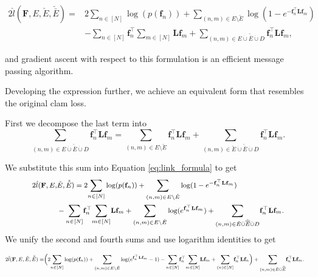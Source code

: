 \documentclass{article}
\theoremstyle{plain}
\theoremstyle{definition}
\theoremstyle{remark}
\begin{document}
\footnotesize
\begin{equation}
\begin{split}
2\hat{l}(\mathbf{F}, E, \check{E},  \check{\bar{E}})=&2\underset{n\in [N]}{\sum} \log(p(\mathbf{f}_n)) 
+ \underset{(n,m)\in E\setminus\check{E}}{\sum} \log(1-e^{-\mathbf{f}_n^\top \mathbf{L} \mathbf{f}_m}) \\
&- \underset{n\in [N]}{\sum} \mathbf{f}_n^\top \underset{m\in [N]}{\sum} \mathbf{L} \mathbf{f}_m
+\underset{(n,m)\in E \dot{\cup} \check{\overline{E}}\dot{\cup}D}{\sum} \mathbf{f}_n^\top \mathbf{L} \mathbf{f}_m,
\end{split}
\label{eq:link_formula}
\end{equation}

and gradient ascent with respect to this formulation is an efficient message passing algorithm.

Developing the expression further, we achieve an equivalent form that resembles the original clam loss.

First we decompose the last term into
\[\underset{(n,m)\in E \dot{\cup} \check{\overline{E}}\dot{\cup}D}{\sum} \mathbf{f}_n^\top \mathbf{L} \mathbf{f}_m = 
\underset{(n,m)\in E \setminus \check{E}}{\sum} \mathbf{f}_n^\top \mathbf{L} \mathbf{f}_m +
\underset{(n,m)\in \check{E} \dot{\cup} \check{\overline{E}}\dot{\cup}D}{\sum} \mathbf{f}_n^\top \mathbf{L} \mathbf{f}_m.\]

We substitute this sum into Equation \ref{eq:link_formula} to get
\[
\footnotesize
\begin{split}
2\hat{l}(\mathbf{F}, E, &\check{E},  \check{\bar{E}})=
2\underset{n\in [N]}{\sum} \log(p(\mathbf{f}_n)) 
+ \underset{(n,m)\in E\setminus\check{E}}{\sum} \log(1-e^{-\mathbf{f}_n^\top \mathbf{L} \mathbf{f}_m}) \\
&- \underset{n\in [N]}{\sum} \mathbf{f}_n^\top \underset{m\in [N]}{\sum} \mathbf{L} \mathbf{f}_m
+\underset{(n,m)\in E\setminus\check{E}}{\sum} \log(e^{\mathbf{f}_n^\top \mathbf{L} \mathbf{f}_m})
+\underset{(n,m)\in \check{E} \dot{\cup} \check{\overline{E}}\dot{\cup}D}{\sum} \mathbf{f}_n^\top \mathbf{L} \mathbf{f}_m.
\end{split}
\]
We unify the second and fourth sums and use logarithm identities to get

\begin{equation}
\footnotesize
\begin{split}
2\hat{l}(\mathbf{F}, E, \check{E},  \check{\bar{E}})=
&\bigg( 2\underset{n\in [N]}{\sum} \log(p(\mathbf{f}_n)) 
+ \underset{(n,m)\in E\setminus\check{E}}{\sum} \log(e^{\mathbf{f}_n^\top \mathbf{L} \mathbf{f}_m} - 1)
- \underset{n\in [N]}{\sum} \mathbf{f}_n^\top \underset{m\in [N]}{\sum} \mathbf{L} \mathbf{f}_m +
\underset{(n)\in [N]}{\sum} \mathbf{f}_n^\top \mathbf{L} \mathbf{f}_n \bigg)
+\underset{(n,m)\in \check{E} \dot{\cup} \check{\overline{E}}}{\sum} \mathbf{f}_n^\top \mathbf{L} \mathbf{f}_m.
\end{split}
\label{eq:link_final_formula}
\end{equation}
\end{document}
